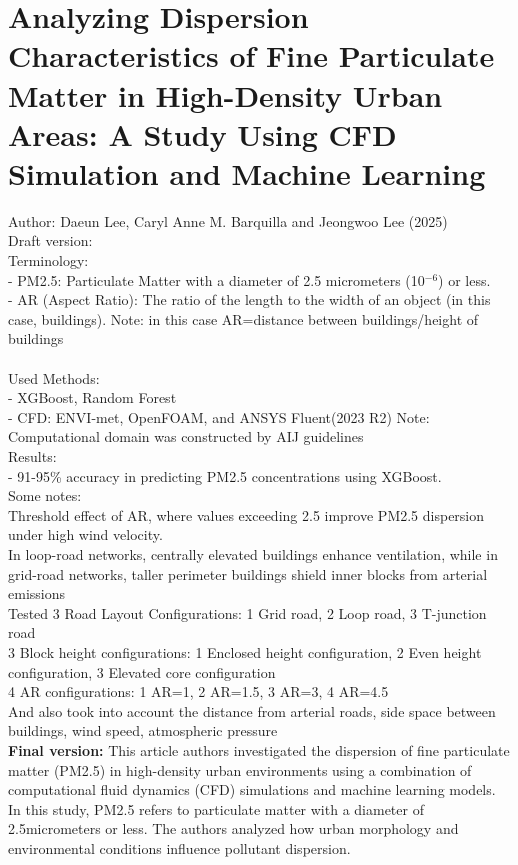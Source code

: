 \documentclass[12pt,a4paper]{article}
\begin{document}
\section{Analyzing Dispersion Characteristics of Fine Particulate Matter
in High-Density Urban Areas: A Study Using CFD Simulation
and Machine Learning}
Author: Daeun Lee, Caryl Anne M. Barquilla and Jeongwoo Lee (2025)\\

Draft version:\\

Terminology: \\
- PM2.5: Particulate Matter with a diameter of 2.5 micrometers (10$^{-6}$) or less. \\
- AR (Aspect Ratio): The ratio of the length to the width of an object (in this case, buildings). Note: in this case AR=distance between buildings/height of buildings\\
\\
Used Methods: \\
- XGBoost, Random Forest\\
- CFD: ENVI-met, OpenFOAM, and ANSYS Fluent(2023 R2) Note: Computational domain was constructed by AIJ guidelines \\
Results: \\
- 91-95\% accuracy in predicting PM2.5 concentrations using XGBoost. \\
Some notes:\\
Threshold effect of AR, where values exceeding 2.5 improve PM2.5 dispersion under high wind velocity. \\
In loop-road networks, centrally elevated buildings enhance ventilation, while in grid-road networks, taller perimeter buildings shield inner blocks from arterial emissions\\
Tested 3 Road Layout Configurations: 1 Grid road, 2 Loop road, 3 T-junction road\\
3 Block height configurations: 1 Enclosed height configuration, 2 Even height configuration, 3 Elevated core configuration\\
4 AR configurations: 1 AR=1, 2 AR=1.5, 3 AR=3, 4 AR=4.5\\
And also took into account the distance from arterial roads, side space between buildings, wind speed, atmospheric pressure\\

\textbf{Final version:}
This article authors investigated the dispersion of fine particulate matter
(PM2.5) in high-density urban environments using a combination of
computational fluid dynamics (CFD) simulations and machine learning models.
In this study, PM2.5 refers to particulate matter with a diameter of
2.5micrometers or less. The authors analyzed how urban morphology and
environmental conditions influence pollutant dispersion.
\end{document}
